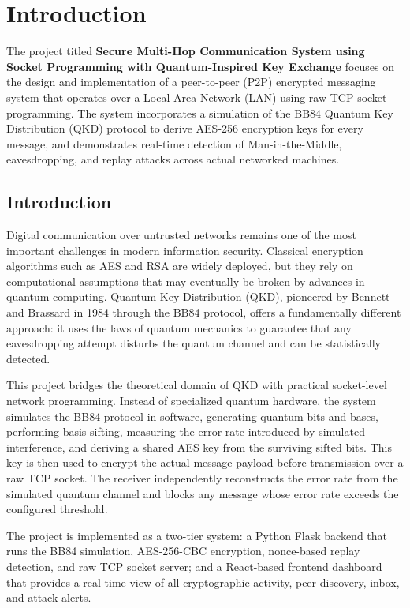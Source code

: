 \chapter{Introduction}

The project titled \textbf{Secure Multi-Hop Communication System using Socket Programming with Quantum-Inspired Key Exchange} focuses on the design and implementation of a peer-to-peer (P2P) encrypted messaging system that operates over a Local Area Network (LAN) using raw TCP socket programming. The system incorporates a simulation of the BB84 Quantum Key Distribution (QKD) protocol to derive AES-256 encryption keys for every message, and demonstrates real-time detection of Man-in-the-Middle, eavesdropping, and replay attacks across actual networked machines.

\section{Introduction}

Digital communication over untrusted networks remains one of the most important challenges in modern information security. Classical encryption algorithms such as AES and RSA are widely deployed, but they rely on computational assumptions that may eventually be broken by advances in quantum computing. Quantum Key Distribution (QKD), pioneered by Bennett and Brassard in 1984 through the BB84 protocol, offers a fundamentally different approach: it uses the laws of quantum mechanics to guarantee that any eavesdropping attempt disturbs the quantum channel and can be statistically detected.

This project bridges the theoretical domain of QKD with practical socket-level network programming. Instead of specialized quantum hardware, the system simulates the BB84 protocol in software, generating quantum bits and bases, performing basis sifting, measuring the error rate introduced by simulated interference, and deriving a shared AES key from the surviving sifted bits. This key is then used to encrypt the actual message payload before transmission over a raw TCP socket. The receiver independently reconstructs the error rate from the simulated quantum channel and blocks any message whose error rate exceeds the configured threshold.

The project is implemented as a two-tier system: a Python Flask backend that runs the BB84 simulation, AES-256-CBC encryption, nonce-based replay detection, and raw TCP socket server; and a React-based frontend dashboard that provides a real-time view of all cryptographic activity, peer discovery, inbox, and attack alerts.

